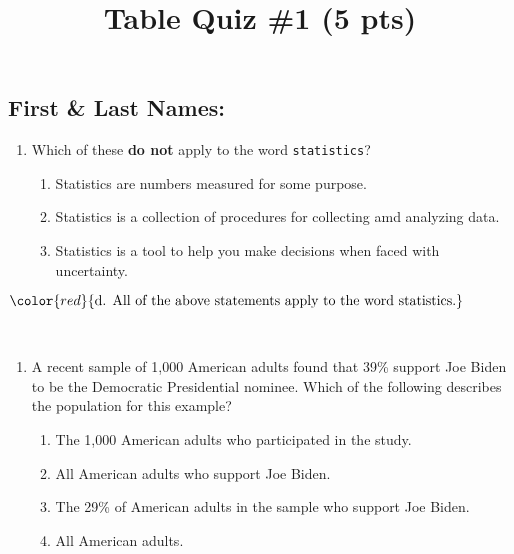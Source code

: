 \documentclass[]{article}
\title{Table Quiz \#1 (5 pts)}
\author{}
\date{}
\begin{document}
\maketitle

\subsection{First \& Last Names:}\label{first-last-names}

\begin{enumerate}
\def\labelenumi{\arabic{enumi}.}
\item
  Which of these \textbf{do not} apply to the word \texttt{statistics}?

  \begin{enumerate}
  \def\labelenumii{\alph{enumii}.}
  \item
    Statistics are numbers measured for some purpose.
  \item
    Statistics is a collection of procedures for collecting amd
    analyzing data.
  \item
    Statistics is a tool to help you make decisions when faced with
    uncertainty.
  \end{enumerate}
\end{enumerate}

\(\color{red}{\text{d. All of the above statements apply to the word statistics.}}\)

~

\begin{enumerate}
\def\labelenumi{\arabic{enumi}.}
\setcounter{enumi}{1}
\item
  A recent sample of 1,000 American adults found that 39\% support Joe
  Biden to be the Democratic Presidential nominee. Which of the
  following describes the population for this example?

  \begin{enumerate}
  \def\labelenumii{\alph{enumii}.}
  \item
    The 1,000 American adults who participated in the study.
  \item
    All American adults who support Joe Biden.
  \item
    The 29\% of American adults in the sample who support Joe Biden.
  \item
    All American adults.
  \end{enumerate}
\end{enumerate}

~
\end{document}
